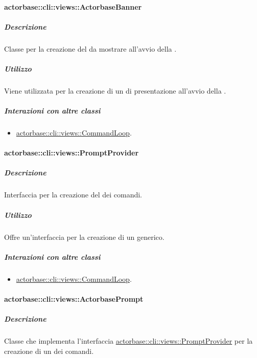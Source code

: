 \documentclass{scalatekids-article}
\begin{document}
\paragraph{actorbase::cli::views::ActorbaseBanner}
\label{sec:actorbase::cli::views::ActorbaseBanner}

\subparagraph{Descrizione}

Classe per la creazione del  da mostrare all'avvio della
.

\subparagraph{Utilizzo}

Viene utilizzata per la creazione di un  di presentazione
all'avvio della .

\subparagraph{Interazioni con altre classi}

\begin{itemize}
\item \hyperref[sec:actorbase::cli::views::CommandLoop]{actorbase::cli::views::CommandLoop}.
\end{itemize}

\paragraph{actorbase::cli::views::PromptProvider}
\label{sec:actorbase::cli::views::PromptProvider}

\subparagraph{Descrizione}

Interfaccia per la creazione del  dei comandi.

\subparagraph{Utilizzo}

Offre un'interfaccia per la creazione di un  generico.

\subparagraph{Interazioni con altre classi}

\begin{itemize}
\item \hyperref[sec:actorbase::cli::views::CommandLoop]{actorbase::cli::views::CommandLoop}.
\end{itemize}

\paragraph{actorbase::cli::views::ActorbasePrompt}
\label{sec:actorbase::cli::views::ActorbasePrompt}

\subparagraph{Descrizione}

Classe che implementa l'interfaccia \hyperref[sec:actorbase::cli::views::PromptProvider]{actorbase::cli::views::PromptProvider} per
la creazione di un  dei comandi.
\end{document}
